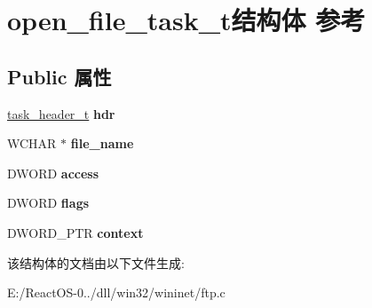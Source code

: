\hypertarget{structopen__file__task__t}{}\section{open\+\_\+file\+\_\+task\+\_\+t结构体 参考}
\label{structopen__file__task__t}
\subsection*{Public 属性}
\begin{DoxyCompactItemize}
\item 
\mbox{\label{structopen__file__task__t_a0706a8dfab5ffb0952c1fce3cf58a602}} 
\hyperlink{structtask__header__t}{task\+\_\+header\+\_\+t} {\bfseries hdr}
\item 
\mbox{\label{structopen__file__task__t_a1927e3668ae8ffa783b47ed6537a8b36}} 
W\+C\+H\+AR $\ast$ {\bfseries file\+\_\+name}
\item 
\mbox{\label{structopen__file__task__t_ae303bc14e9009865e89720617e6e86a8}} 
D\+W\+O\+RD {\bfseries access}
\item 
\mbox{\label{structopen__file__task__t_aa8499298958e55a588bc1c221b044264}} 
D\+W\+O\+RD {\bfseries flags}
\item 
\mbox{\label{structopen__file__task__t_a74464c14f23f33d8376a353865b92917}} 
D\+W\+O\+R\+D\+\_\+\+P\+TR {\bfseries context}
\end{DoxyCompactItemize}


该结构体的文档由以下文件生成\+:\begin{DoxyCompactItemize}
\item 
E\+:/\+React\+O\+S-\/0../dll/win32/wininet/ftp.\+c\end{DoxyCompactItemize}
